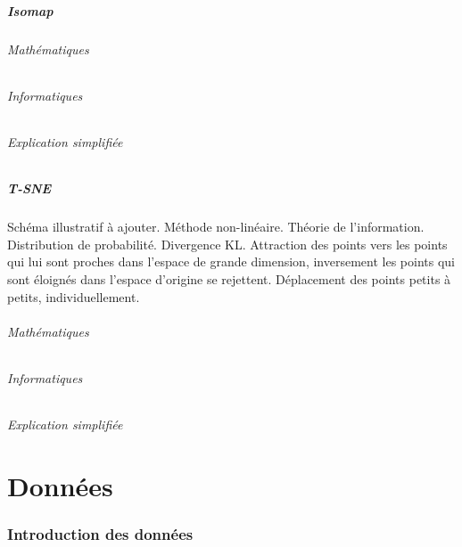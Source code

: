 \documentclass[12pt]{article}
\begin{document}
\subsubsection{Isomap}

\paragraph{Mathématiques}
\paragraph{Informatiques}
\paragraph{Explication simplifiée}

\subsubsection{T-SNE}

Schéma illustratif à ajouter.
Méthode non-linéaire.
Théorie de l'information.
Distribution de probabilité.
Divergence KL.
Attraction des points vers les points qui lui sont proches dans l’espace de grande dimension, inversement les points qui sont éloignés dans l’espace d’origine se rejettent. Déplacement des points petits à petits, individuellement.

\paragraph{Mathématiques}
\paragraph{Informatiques}
\paragraph{Explication simplifiée}

\newpage
\part{Données}

\section{Introduction des données}
\end{document}
